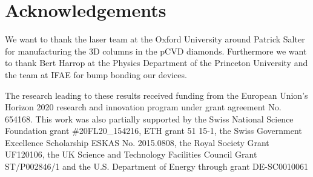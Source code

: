 \section*{Acknowledgements} 
We want to thank the laser team at the Oxford University around Patrick Salter for manufacturing the 3D columns in the \ac{pCVD} diamonds. Furthermore we want to thank Bert Harrop at the Physics Department of the Princeton University and the team at IFAE for bump bonding our devices.\par
The research leading to these results received funding from the European Union's Horizon 2020 research and innovation program under grant agreement No. 654168. This work was also partially supported by the Swiss National Science Foundation grant \#20FL20\_154216, ETH grant 51 15-1, the  Swiss Government Excellence Scholarship ESKAS No. 2015.0808, the Royal Society Grant UF120106, the UK Science and Technology Facilities Council Grant ST/P002846/1 and the U.S. Department of Energy through grant DE-SC0010061
